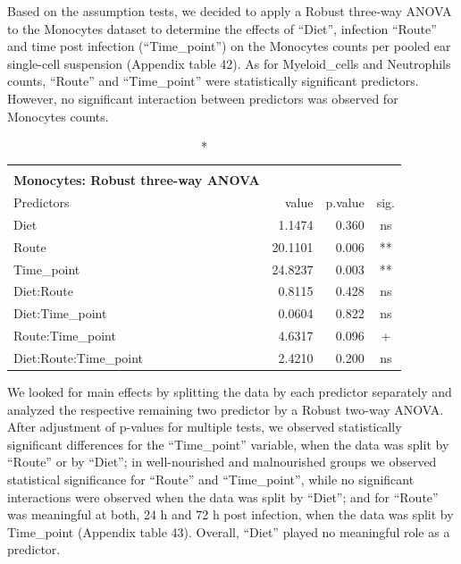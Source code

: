 \documentclass[
  12pt,
  letterpaper,
]{article}
\begin{document}
Based on the assumption tests, we decided to apply a Robust three-way ANOVA to the Monocytes dataset to determine the effects of ``Diet'', infection ``Route'' and time post infection (``Time\_point'') on the Monocytes counts per pooled ear single-cell suspension (Appendix table 42). As for Myeloid\_cells and Neutrophils counts, ``Route'' and ``Time\_point'' were statistically significant predictors. However, no significant interaction between predictors was observed for Monocytes counts.

\begingroup
\fontsize{12.0pt}{14.4pt}\selectfont
\begin{longtable}{l|rrc}
\caption*{
{\large \textbf{Appendix Table 42}} \\ 
{\small \textbf{Monocytes: Robust three-way ANOVA}}
} \\ 
\toprule
Predictors & {value} & {p.value} & {sig.} \\ 
\midrule\addlinespace[2.5pt]
Diet & 1.1474 & 0.360 & ns \\ 
Route & 20.1101 & 0.006 & ** \\ 
Time\_point & 24.8237 & 0.003 & ** \\ 
Diet:Route & 0.8115 & 0.428 & ns \\ 
Diet:Time\_point & 0.0604 & 0.822 & ns \\ 
Route:Time\_point & 4.6317 & 0.096 & + \\ 
Diet:Route:Time\_point & 2.4210 & 0.200 & ns \\ 
\bottomrule
\end{longtable}
\endgroup

We looked for main effects by splitting the data by each predictor separately and analyzed the respective remaining two predictor by a Robust two-way ANOVA. After adjustment of p-values for multiple tests, we observed statistically significant differences for the ``Time\_point'' variable, when the data was split by ``Route'' or by ``Diet''; in well-nourished and malnourished groups we observed statistical significance for ``Route'' and ``Time\_point'', while no significant interactions were observed when the data was split by ``Diet''; and for ``Route'' was meaningful at both, 24 h and 72 h post infection, when the data was split by Time\_point (Appendix table 43). Overall, ``Diet'' played no meaningful role as a predictor.
\end{document}
